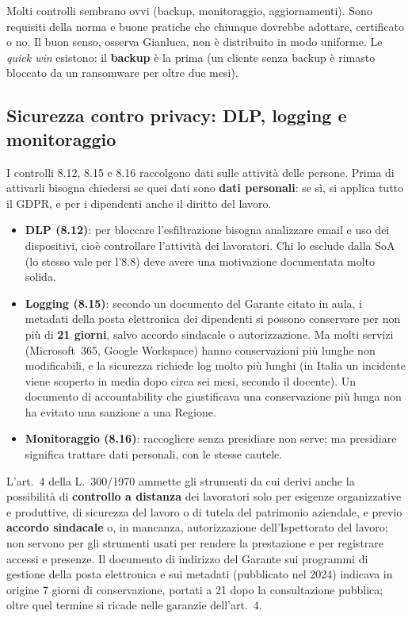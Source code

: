 \begin{nota}
Molti controlli sembrano ovvi (backup, monitoraggio, aggiornamenti). Sono requisiti della norma e buone
pratiche che chiunque dovrebbe adottare, certificato o no. Il buon senso, osserva Gianluca, non è
distribuito in modo uniforme. Le \emph{quick win} esistono: il \textbf{backup} è la prima (un cliente senza
backup è rimasto bloccato da un ransomware per oltre due mesi).
\end{nota}

\subsection{Sicurezza contro privacy: DLP, logging e monitoraggio}
\label{sec:iso-privacy}
I controlli 8.12, 8.15 e 8.16 raccolgono dati sulle attività delle persone. Prima di attivarli bisogna
chiedersi se quei dati sono \textbf{dati personali}: se sì, si applica tutto il GDPR, e per i dipendenti
anche il diritto del lavoro.
\begin{itemize}
  \item \textbf{DLP (8.12)}: per bloccare l'esfiltrazione bisogna analizzare email e uso dei dispositivi,
    cioè controllare l'attività dei lavoratori. Chi lo esclude dalla SoA (lo stesso vale per l'8.8) deve avere
    una motivazione documentata molto solida.
  \item \textbf{Logging (8.15)}: secondo un documento del Garante citato in aula, i metadati della posta
    elettronica dei dipendenti si possono conservare per non più di \textbf{21 giorni}, salvo accordo
    sindacale o autorizzazione. Ma molti servizi (Microsoft~365, Google Workspace) hanno conservazioni più
    lunghe non modificabili, e la sicurezza richiede log molto più lunghi (in Italia un incidente viene
    scoperto in media dopo circa sei mesi, secondo il docente). Un documento di accountability che
    giustificava una conservazione più lunga non ha evitato una sanzione a una Regione.
  \item \textbf{Monitoraggio (8.16)}: raccogliere senza presidiare non serve; ma presidiare significa
    trattare dati personali, con le stesse cautele.
\end{itemize}

\begin{integrazione}
L'art.~4 della L.~300/1970 ammette gli strumenti da cui derivi anche la possibilità di \textbf{controllo a
distanza} dei lavoratori solo per esigenze organizzative e produttive, di sicurezza del lavoro o di tutela
del patrimonio aziendale, e previo \textbf{accordo sindacale} o, in mancanza, autorizzazione
dell'Ispettorato del lavoro; non servono per gli strumenti usati per rendere la prestazione e per registrare
accessi e presenze. Il documento di indirizzo del Garante sui programmi di gestione della posta elettronica e
sui metadati (pubblicato nel 2024) indicava in origine 7 giorni di conservazione, portati a 21 dopo la
consultazione pubblica; oltre quel termine si ricade nelle garanzie dell'art.~4.
\end{integrazione}

